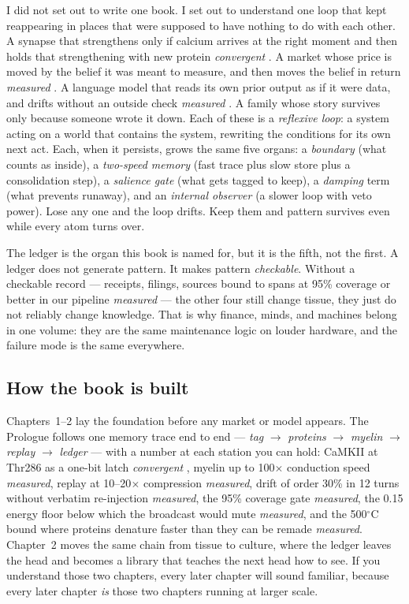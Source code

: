 I did not set out to write one book. I set out to understand one loop that kept reappearing in places that were supposed to have nothing to do with each other. A synapse that strengthens only if calcium arrives at the right moment and then holds that strengthening with new protein \textit{convergent} \citep{kandel2000}. A market whose price is moved by the belief it was meant to measure, and then moves the belief in return \textit{measured} \citep{soros}. A language model that reads its own prior output as if it were data, and drifts without an outside check \textit{measured} \citep{panickssery2024,shumailov2024}. A family whose story survives only because someone wrote it down. Each of these is a \textit{reflexive loop}: a system acting on a world that contains the system, rewriting the conditions for its own next act. Each, when it persists, grows the same five organs: a \textit{boundary} (what counts as inside), a \textit{two-speed memory} (fast trace plus slow store plus a consolidation step), a \textit{salience gate} (what gets tagged to keep), a \textit{damping} term (what prevents runaway), and an \textit{internal observer} (a slower loop with veto power). Lose any one and the loop drifts. Keep them and pattern survives even while every atom turns over.

The ledger is the organ this book is named for, but it is the fifth, not the first. A ledger does not generate pattern. It makes pattern \textit{checkable}. Without a checkable record --- receipts, filings, sources bound to spans at 95\% coverage or better in our pipeline \textit{measured} --- the other four still change tissue, they just do not reliably change knowledge. That is why finance, minds, and machines belong in one volume: they are the same maintenance logic on louder hardware, and the failure mode is the same everywhere.

\subsection*{How the book is built}

Chapters~1--2 lay the foundation before any market or model appears. The Prologue follows one memory trace end to end --- \textit{tag} $\to$ \textit{proteins} $\to$ \textit{myelin} $\to$ \textit{replay} $\to$ \textit{ledger} --- with a number at each station you can hold: CaMKII at Thr286 as a one-bit latch \textit{convergent} \citep{kandel2000}, myelin up to 100$\times$ conduction speed \textit{measured}, replay at 10--20$\times$ compression \textit{measured}, drift of order 30\% in 12 turns without verbatim re-injection \textit{measured}, the 95\% coverage gate \textit{measured}, the 0.15 energy floor below which the broadcast would mute \textit{measured}, and the 500$^\circ$C bound where proteins denature faster than they can be remade \textit{measured}. Chapter~2 moves the same chain from tissue to culture, where the ledger leaves the head and becomes a library that teaches the next head how to see. If you understand those two chapters, every later chapter will sound familiar, because every later chapter \textit{is} those two chapters running at larger scale.

